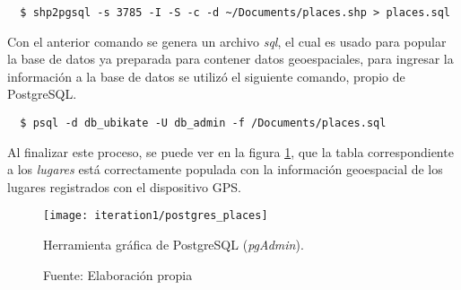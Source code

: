 \begin{verbatim}
  $ shp2pgsql -s 3785 -I -S -c -d ~/Documents/places.shp > places.sql
\end{verbatim}

Con el anterior comando se genera un archivo \emph{sql}, el cual es usado para popular la base de datos ya preparada para contener datos geoespaciales, para ingresar la información a la base de datos se utilizó el siguiente comando, propio de PostgreSQL.


%
%
\begin{verbatim}
  $ psql -d db_ubikate -U db_admin -f /Documents/places.sql
\end{verbatim}

Al finalizar este proceso, se puede ver en la figura \ref{fig:postgres_places}, que la tabla correspondiente a los \emph{lugares} está correctamente populada con la información geoespacial de los lugares registrados con el dispositivo GPS. 

\begin{figure}[H]
  \begin{center}
    \texttt{[image: iteration1/postgres\_places]}
    \caption{Herramienta gráfica de PostgreSQL (\emph{pgAdmin}).}
    \label{fig:postgres_places}
    \caption*{Fuente: Elaboración propia}
  \end{center}
\end{figure}
%


